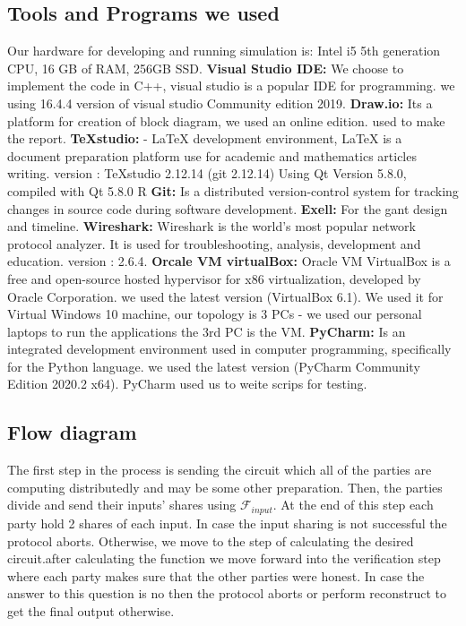 \documentclass[12pt]{article}
\begin{document}
\subsection{Tools and Programs we used}
Our hardware for developing and running simulation is: \hfill\break
Intel i5 5th generation CPU, 16 GB of RAM, 256GB SSD. \hfill\break \hfill\break
\textbf{Visual Studio IDE:} We choose to implement the code in C++, visual studio is a popular IDE for programming. we using 16.4.4 version of visual studio Community edition 2019.
\hfill\break \hfill\break
\textbf{Draw.io:} Its a platform for creation of block diagram, we used an online edition. used to make the report. 
\hfill\break \hfill\break
\textbf{TeXstudio:} - LaTeX development environment, LaTeX is a document preparation platform use for academic and mathematics articles writing. version : TeXstudio 2.12.14 (git 2.12.14)
Using Qt Version 5.8.0, compiled with Qt 5.8.0 R
\hfill\break
\hfill\break
\textbf{Git:} Is a distributed version-control system for tracking changes in source code during software development.
\hfill\break
\hfill\break
\textbf{Exell:} For the gant design and timeline.
\hfill\break
\hfill\break
\textbf{Wireshark:} Wireshark is the world’s most popular network protocol analyzer. It is used for troubleshooting, analysis, development and education. version : 2.6.4.
\hfill\break
\hfill\break
\textbf{Orcale VM virtualBox:} Oracle VM VirtualBox is a free and open-source hosted hypervisor for x86 virtualization, developed by Oracle Corporation. we used the latest version (VirtualBox 6.1). We used it for Virtual Windows 10 machine, our topology is 3 PCs - we used our personal laptops to run the applications the 3rd PC is the VM.
\hfill\break
\hfill\break
\textbf{PyCharm:} Is an integrated development environment used in computer programming, specifically for the Python language. we used the latest version (PyCharm Community Edition 2020.2 x64). PyCharm used us to weite scrips for testing.

\pagebreak
\subsection{Flow diagram}
The first step in the process is sending the circuit which all of the parties are computing distributedly and may be some other preparation. Then, the parties divide and send their inputs’ shares using $\mathcal{F}_{input}$. At the end of this step each party hold 2 shares of each input. In case the input sharing is not successful the protocol aborts. Otherwise, we move to the step of calculating the desired circuit.after calculating the function we move forward into the verification step where each party makes sure that the other parties were honest. In case the answer to this question is no then the protocol aborts or perform reconstruct to get the final output otherwise.
\end{document}
